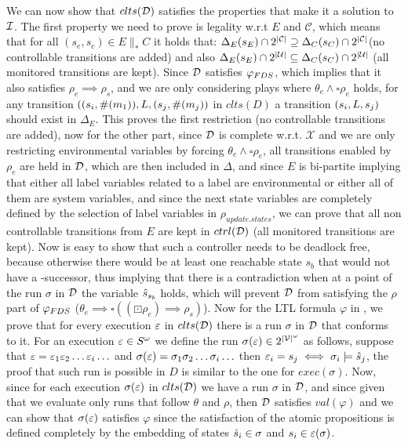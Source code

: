 We can now show that $clts(\mathcal{D})$ satisfies the properties that make it a solution to $\mathcal{I}$. The first property we need to prove is legality w.r.t $E$ and $\mathcal{C}$, which means that for all $(s_e,s_c) \in E \parallel_* C$ it holds that:
$\Delta_{E}(s_E)\cap 2^{|\mathcal{C}|} \supseteq \Delta_{C}(s_C)\cap 2^{|\mathcal{C}|}$(no controllable transitions are added) and also $\Delta_{E}(s_E)\cap 2^{|\mathcal{U}|} \subseteq \Delta_{C}(s_C)\cap 2^{|\mathcal{U}|}$ (all monitored transitions are kept). Since $\mathcal{D}$ satisfies $\varphi_{FDS}$, which implies that it also satisfies $\rho_e \implies \rho_s$, and we are only considering plays where $\theta_e \wedge \square \rho_e$ holds, for any transition $((s_i, \#(m_1)),L,(s_j,\#(m_j))$ in $clts(D)$ a transition $(s_i, L, s_j)$ should exist in $\Delta_E$. This proves the first restriction (no controllable transitions are added), now for the other part, since $\mathcal{D}$ is complete w.r.t. $\mathcal{X}$ and we are only restricting environmental variables by forcing $\theta_e \wedge \square\rho_e$, all transitions enabled by $\rho_e$ are held in $\mathcal{D}$, which are then included in $\Delta$, and since $E$ is bi-partite implying that either all label variables related to a label are environmental or either all of them are system variables, and since the next state variables are completely defined by the selection of label variables in $\rho_{update.states}$, we can prove that all non controllable transitions from $E$ are kept in $ctrl(\mathcal{D})$ (all monitored transitions are kept). Now is easy to show that such a controller needs to be deadlock free, because otherwise there would be at least one reachable state $s_b$ that would not have a \fdsD-successor, thus implying that there is a contradiction when at a point of the run $\sigma$ in $\mathcal{D}$ the variable $\hat{s}_{s_b}$ holds, which will prevent $\mathcal{D}$ from satisfying the $\rho$ part of $\varphi_{FDS}$ ($\theta_e \implies \square((\boxdot \rho_e) \implies \rho_s)$).  
Now for the LTL formula $\varphi$ in \controlProblem, we prove that for every execution $\varepsilon$ in $clts(\mathcal{D})$ there is a run $\sigma$ in $\mathcal{D}$ that conforms to it.
For an execution $\varepsilon \in S^{\omega}$ we define the run $\sigma(\varepsilon) \in 2^{|\mathcal{V}|^{\omega}}$ as follows, suppose that $\varepsilon= \varepsilon_1 \varepsilon_2 \ldots \varepsilon_i \ldots$ and $\sigma(\varepsilon) = \sigma_1 \sigma_2 \ldots \sigma_i \ldots$ 
 then $\varepsilon_i = s_j \iff \sigma_i \models \hat{s}_{j}$, the proof that such run is possible in $D$ is similar to the one for $exec(\sigma)$.
Now, since for each execution $\sigma(\varepsilon)$ in $clts(\mathcal{D})$ we have a run $\sigma$ in $\mathcal{D}$, and since given that we evaluate only runs that follow $\theta$ and $\rho$, then $\mathcal{D}$ satisfies $val(\varphi)$ and we can show that $\sigma(\varepsilon)$ satisfies $\varphi$ since the satisfaction of the atomic propositions is defined completely by the embedding of states $\hat{s}_{i} \in \sigma$ and $s_i \in \varepsilon(\sigma)$.